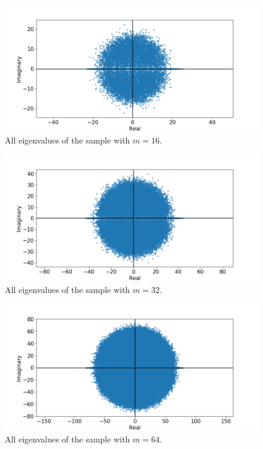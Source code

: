 \documentclass[a4paper, 11pt]{article}
\begin{document}
\begin{figure}
  \centering
  \includegraphics[width=\textwidth]{../2/square_evs/16.png}
  \caption{All eigenvalues of the sample with $m=16$.}
  \label{fig:evs_16}
\end{figure}
\begin{figure}
  \centering
  \includegraphics[width=\textwidth]{../2/square_evs/32.png}
  \caption{All eigenvalues of the sample with $m=32$.}
  \label{fig:evs_32}
\end{figure}
\begin{figure}
  \centering
  \includegraphics[width=\textwidth]{../2/square_evs/64.png}
  \caption{All eigenvalues of the sample with $m=64$.}
  \label{fig:evs_64}
\end{figure}
\end{document}
